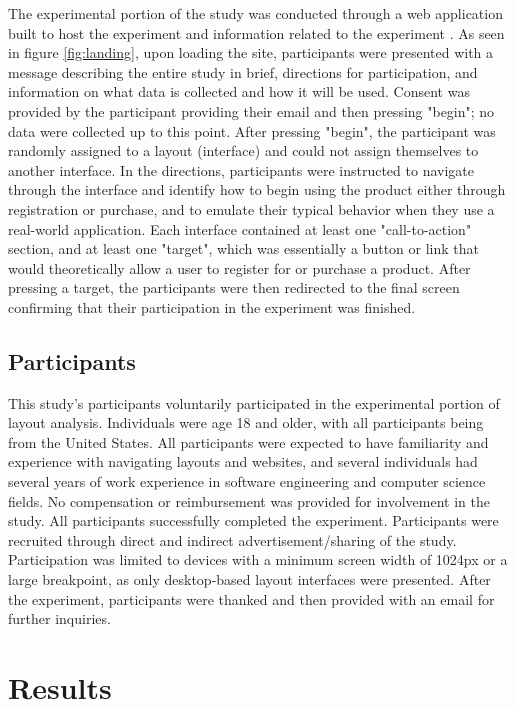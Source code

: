 \documentclass[conference]{IEEEtran}
\begin{document}
The experimental portion of the study was conducted through a web application built to host the experiment and information related to the experiment \cite{sorin}. As seen in figure \ref{fig:landing}, upon loading the site, participants were presented with a message describing the entire study in brief, directions for participation, and information on what data is collected and how it will be used. Consent was provided by the participant providing their email and then pressing "begin"; no data were collected up to this point. After pressing "begin", the participant was randomly assigned to a layout (interface) and could not assign themselves to another interface. In the directions, participants were instructed to navigate through the interface and identify how to begin using the product either through registration or purchase, and to emulate their typical behavior when they use a real-world application. Each interface contained at least one "call-to-action" section, and at least one "target", which was essentially a button or link that would theoretically allow a user to register for or purchase a product. After pressing a target, the participants were then redirected to the final screen confirming that their participation in the experiment was finished.


\subsection{Participants}

This study's participants voluntarily participated in the experimental portion of layout analysis. Individuals were age 18 and older, with all participants being from the United States. All participants were expected to have familiarity and experience with navigating layouts and websites, and several individuals had several years of work experience in software engineering and computer science fields. No compensation or reimbursement was provided for involvement in the study. All participants successfully completed the experiment. Participants were recruited through direct and indirect advertisement/sharing of the study. Participation was limited to devices with a minimum screen width of 1024px or a large breakpoint, as only desktop-based layout interfaces were presented. After the experiment, participants were thanked and then provided with an email for further inquiries.

\section{Results}
\end{document}
